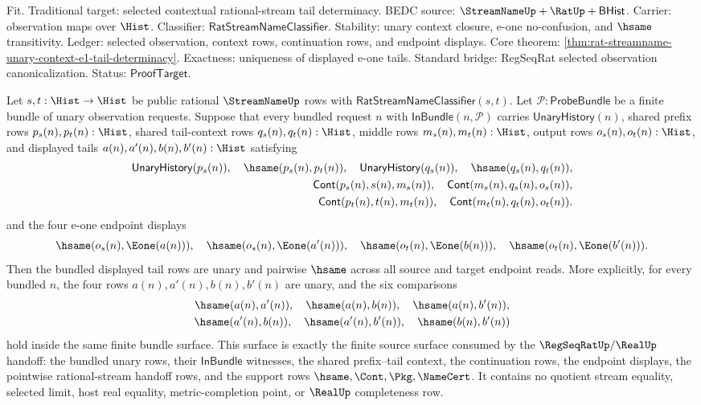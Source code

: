 Fit. Traditional target: selected contextual rational-stream tail determinacy.
BEDC source: $\StreamNameUp+\RatUp+\mathsf{BHist}$. Carrier: observation maps
over $\Hist$. Classifier: $\mathsf{RatStreamNameClassifier}$. Stability:
unary context closure, e-one no-confusion, and $\hsame$ transitivity. Ledger:
selected observation, context rows, continuation rows, and endpoint displays.
Core theorem:
\autoref{thm:rat-streamname-unary-context-e1-tail-determinacy}. Exactness:
uniqueness of displayed e-one tails. Standard bridge: RegSeqRat selected
observation canonicalization. Status: $\mathsf{ProofTarget}$.

\begin{theorem}
\label{thm:rat-streamname-unary-context-bundled-tail-determinacy}
Let $s,t:\Hist\to\Hist$ be public rational $\StreamNameUp$ rows with
$\mathsf{RatStreamNameClassifier}(s,t)$. Let
$\mathcal P:\mathsf{ProbeBundle}$ be a finite bundle of unary observation
requests. Suppose that every bundled request $n$ with
$\mathsf{InBundle}(n,\mathcal P)$ carries $\mathsf{UnaryHistory}(n)$, shared
prefix rows $p_s(n),p_t(n):\Hist$, shared tail-context rows
$q_s(n),q_t(n):\Hist$, middle rows $m_s(n),m_t(n):\Hist$, output rows
$o_s(n),o_t(n):\Hist$, and displayed tails
$a(n),a'(n),b(n),b'(n):\Hist$ satisfying
$$
\begin{aligned}
\mathsf{UnaryHistory}(p_s(n)),\quad \hsame(p_s(n),p_t(n)),\quad
\mathsf{UnaryHistory}(q_s(n)),\quad \hsame(q_s(n),q_t(n)),\\
\mathsf{Cont}(p_s(n),s(n),m_s(n)),\quad
\mathsf{Cont}(m_s(n),q_s(n),o_s(n)),\\
\mathsf{Cont}(p_t(n),t(n),m_t(n)),\quad
\mathsf{Cont}(m_t(n),q_t(n),o_t(n)).
\end{aligned}
$$
and the four e-one endpoint displays
$$
\hsame(o_s(n),\Eone(a(n))),\quad
\hsame(o_s(n),\Eone(a'(n))),\quad
\hsame(o_t(n),\Eone(b(n))),\quad
\hsame(o_t(n),\Eone(b'(n))).
$$
Then the bundled displayed tail rows are unary and pairwise $\hsame$ across
all source and target endpoint reads. More explicitly, for every bundled
$n$, the four rows $a(n),a'(n),b(n),b'(n)$ are unary, and the six comparisons
$$
\begin{gathered}
\hsame(a(n),a'(n)),\quad \hsame(a(n),b(n)),\quad
\hsame(a(n),b'(n)),\\
\hsame(a'(n),b(n)),\quad \hsame(a'(n),b'(n)),\quad
\hsame(b(n),b'(n))
\end{gathered}
$$
hold inside the same finite bundle surface. This surface is exactly the
finite source surface consumed by the $\RegSeqRatUp/\RealUp$ handoff: the
bundled unary rows, their $\mathsf{InBundle}$ witnesses, the shared
prefix--tail context, the continuation rows, the endpoint displays, the
pointwise rational-stream handoff rows, and the support rows
$\hsame,\Cont,\Pkg,\NameCert$. It contains no quotient stream equality,
selected limit, host real equality, metric-completion point, or $\RealUp$
completeness row.
\end{theorem}

